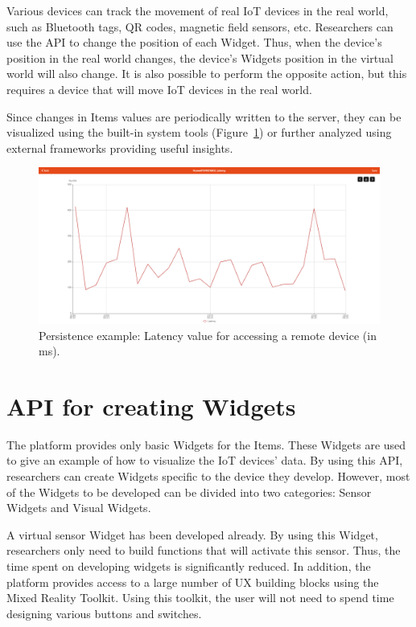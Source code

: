 Various devices can track the movement of real IoT devices in the real world, such as Bluetooth tags, QR codes, magnetic field sensors, etc. Researchers can use the API to change the position of each Widget. Thus, when the device's position in the real world changes, the device's Widgets position in the virtual world will also change. It is also possible to perform the opposite action, but this requires a device that will move IoT devices in the real world.

Since changes in Items values are periodically written to the server, they can be visualized using the built-in system tools (Figure~\ref{fig:PersistenceExample-figure}) or further analyzed using external frameworks providing useful insights.

\begin{figure}
  \centering
  \includegraphics[width=0.9\linewidth]{figures/PersistenceExample.png}
  \caption{Persistence example: Latency value for accessing a remote device (in ms). }
  \label{fig:PersistenceExample-figure}
\end{figure}

\section{API for creating Widgets}

The platform provides only basic Widgets for the Items. These Widgets are used to give an example of how to visualize the IoT devices' data. By using this API, researchers can create Widgets specific to the device they develop. However, most of the Widgets to be developed can be divided into two categories: Sensor Widgets and Visual Widgets.

A virtual sensor Widget has been developed already. By using this Widget, researchers only need to build functions that will activate this sensor. Thus, the time spent on developing widgets is significantly reduced. In addition, the platform provides access to a large number of UX building blocks using the Mixed Reality Toolkit. Using this toolkit, the user will not need to spend time designing various buttons and switches. 



